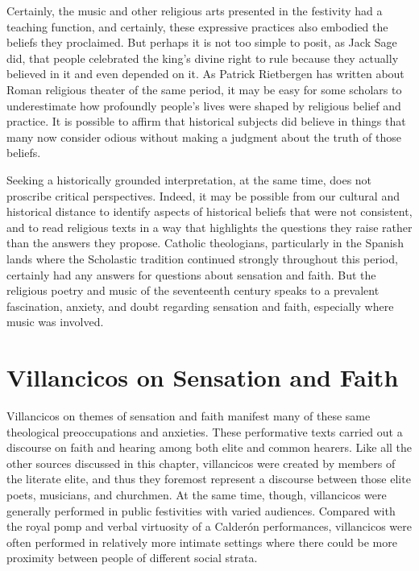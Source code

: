 Certainly, the music and other religious arts presented in the festivity had a teaching function, and certainly, these expressive practices also embodied the beliefs they proclaimed.
But perhaps it is not too simple to posit, as Jack Sage did, that people celebrated the king's divine right to rule because they actually believed in it and even depended on it.%
  \autocite{Sage:Instrumentum}
As Patrick Rietbergen has written about Roman religious theater of the same period, it may be easy for some scholars to underestimate how profoundly people's lives were shaped by religious belief and practice.%
  \autocite[\XXX]{Rietbergen:Power}
It is possible to affirm that historical subjects did believe in things that many now consider odious without making a judgment about the truth of those beliefs.

Seeking a historically grounded interpretation, at the same time, does not proscribe critical perspectives.
Indeed, it may be possible from our cultural and historical distance to identify aspects of historical beliefs that were not consistent, and to read religious texts in a way that highlights the questions they raise rather than the answers they propose.
Catholic theologians, particularly in the Spanish lands where the Scholastic tradition continued strongly throughout this period, certainly had any answers for questions about sensation and faith.
But the religious poetry and music of the seventeenth century speaks to a prevalent fascination, anxiety, and doubt regarding sensation and faith, especially where music was involved.


\section{Villancicos on Sensation and Faith}

Villancicos on themes of sensation and faith manifest many of these same theological preoccupations and anxieties.
These performative texts carried out a discourse on faith and hearing among both elite and common hearers.
Like all the other sources discussed in this chapter, villancicos were created by members of the literate elite, and thus they foremost represent a discourse between those elite poets, musicians, and churchmen.
At the same time, though, villancicos were generally performed in public festivities with varied audiences. 
Compared with the royal pomp and verbal virtuosity of a Calderón  performances, villancicos were often performed in relatively more intimate settings where there could be more proximity between people of different social strata.

